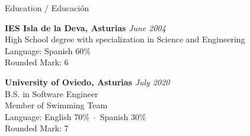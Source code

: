 \documentclass{resume} %
\begin{document}



\pagestyle{fancy}

\def\headrulewidth{0pt}
\setlength{\ruleheight}{\textheight}
\addtolength{\ruleheight}{20mm}
\fancyhead{}
\fancyfoot{}
\fancyfoot[C]{\footnotesize\thepage}





\begin{rSection}{Education / Educación}

{\bf IES Isla de la Deva, Asturias} \hfill {\em June 2004} \\ 
High School degree with specialization in Science and Engineering \\
Language: Spanish 60\% \\
Rounded Mark: 6

{\bf University of Oviedo, Asturias} \hfill {\em July 2020} \\ 
B.S. in Software Engineer \\
Member of Swimming Team \\
Language: English 70\%~$\cdot$~Spanish 30\% \\
Rounded Mark: 7

\end{rSection}

\end{document}
